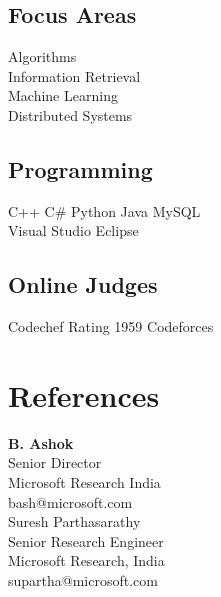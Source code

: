 \documentclass[]{resume-openfont}
\begin{document}
\begin{minipage}[t]{0.30\textwidth}
\subsection{Focus Areas}
Algorithms \\
Information Retrieval \\
Machine Learning \\
Distributed Systems \\
\sectionsep

\subsection{Programming}
C++ \textbullet{}   C\# \textbullet{} Python \textbullet{} Java \textbullet{} MySQL \\
Visual Studio \textbullet{} Eclipse \textbullet{} \\

\sectionsep

\subsection{Online Judges}
Codechef Rating 1959
Codeforces
\sectionsep

\section{References}
\textbf{B. Ashok} \\
Senior Director \\
Microsoft Research India \\
bash@microsoft.com \\
\sectionsep
Suresh Parthasarathy \\
Senior Research Engineer \\
Microsoft Research, India \\
supartha@microsoft.com
%
%

\end{minipage} 
\hfill
\end{document}
